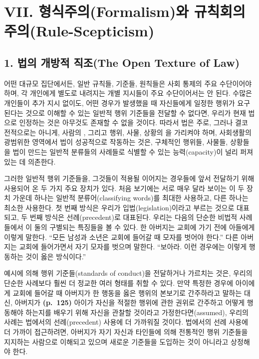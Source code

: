 \section{VII. 형식주의(Formalism)와
규칙회의주의(Rule-Scepticism)}\label{vii.-uxd615uxc2dduxc8fcuxc758formalismuxc640-uxaddcuxce59uxd68cuxc758uxc8fcuxc758rule-scepticism}

\subsection{1. 법의 개방적 직조(The Open Texture of
Law)}\label{uxbc95uxc758-uxac1cuxbc29uxc801-uxc9c1uxc870the-open-texture-of-law}

어떤 대규모 집단에서든, 일반 규칙들, 기준들, 원칙들은 사회 통제의 주요
수단이어야 하며, 각 개인에게 별도로 내려지는 개별 지시들이 주요
수단이어서는 안 된다. 수많은 개인들이 추가 지시 없이도, 어떤 경우가
발생했을 때 자신들에게 일정한 행위가 요구된다는 것으로 이해할 수 있는
일반적 행위 기준들을 전달할 수 없다면, 우리가 현재 법으로 인정하는 것은
아무것도 존재할 수 없을 것이다. 따라서 법은 주로, 그러나 결코 전적으로는
아니게, 사람의 , 그리고 행위, 사물, 상황의
을 가리켜야 하며, 사회생활의 광범위한 영역에서
법이 성공적으로 작동하는 것은, 구체적인 행위들, 사물들, 상황들을 법이
만드는 일반적 분류들의 사례들로 식별할 수 있는 능력(capacity)이 널리
퍼져 있는 데 의존한다.

그러한 일반적 행위 기준들을, 그것들이 적용될 이어지는 경우들에 앞서
전달하기 위해 사용되어 온 두 가지 주요 장치가 있다. 처음 보기에는 서로
매우 달라 보이는 이 두 장치 가운데 하나는 일반적 분류어(classifying
words)를 최대한 사용하고, 다른 하나는 최소한 사용한다. 첫 번째 방식은
우리가 입법(legislation)이라고 부르는 것으로 대표되고, 두 번째 방식은
선례(precedent)로 대표된다. 우리는 다음의 단순한 비법적 사례들에서 이
둘의 구별되는 특징들을 볼 수 있다. 한 아버지는 교회에 가기 전에 아들에게
이렇게 말한다. “모든 남성과 소년은 교회에 들어갈 때 모자를 벗어야
한다.” 다른 아버지는 교회에 들어가면서 자기 모자를 벗으며 말한다.
“보아라. 이런 경우에는 이렇게 행동하는 것이 옳은 방식이다.”

예시에 의해 행위 기준들(standards of conduct)을 전달하거나 가르치는
것은, 우리의 단순한 사례보다 훨씬 더 정교한 여러 형태를 취할 수 있다.
만약 특정한 경우에 아이에게 교회에 들어갈 때 아버지가 한 행동을 옳은
행위의 본보기로 간주하라고 말하는 대신, 아버지가 \textbf{(p.~125)}
아이가 자신을 적절한 행위에 관한 권위로 간주하고 어떻게 행동해야
하는지를 배우기 위해 자신을 관찰할 것이라고 가정한다면(assumed), 우리의
사례는 법에서의 선례(precedent) 사용에 더 가까워질 것이다. 법에서의 선례
사용에 더 가까이 접근하려면, 아버지가 자기 자신과 타인들에 의해 전통적인
행위 기준들을 지지하는 사람으로 이해되고 있으며 새로운 기준들을 도입하는
것이 아니라고 상정해야 한다.

